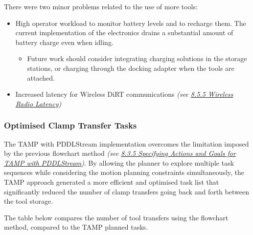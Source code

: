 There were two minor problems related to the use of more tools:

\begin{itemize}
	\item High operator workload to monitor battery levels and to recharge them. The current implementation of the electronics drains a substantial amount of battery charge even when idling.

\begin{itemize}
	\item Future work should consider integrating charging solutions in the storage stations, or charging through the docking adapter when the tools are attached.

\end{itemize}
	\item Increased latency for Wireless DiRT communications\textit{ (see \uline{8.5.5 Wireless Radio Latency})}

\end{itemize}

\subsubsection{Optimised Clamp Transfer Tasks}

The TAMP with PDDLStream implementation overcomes the limitation imposed by the previous flowchart method \textit{(see \uline{8.3.5 Specifying Actions and Goals for TAMP with PDDLStream})}. By allowing the planner to explore multiple task sequences while considering the motion planning constraints simultaneously, the TAMP approach generated a more efficient and optimised task list that significantly reduced the number of clamp transfers going back and forth between the tool storage. 

The table below compares the number of tool transfers using the flowchart method, compared to the TAMP planned tasks.

